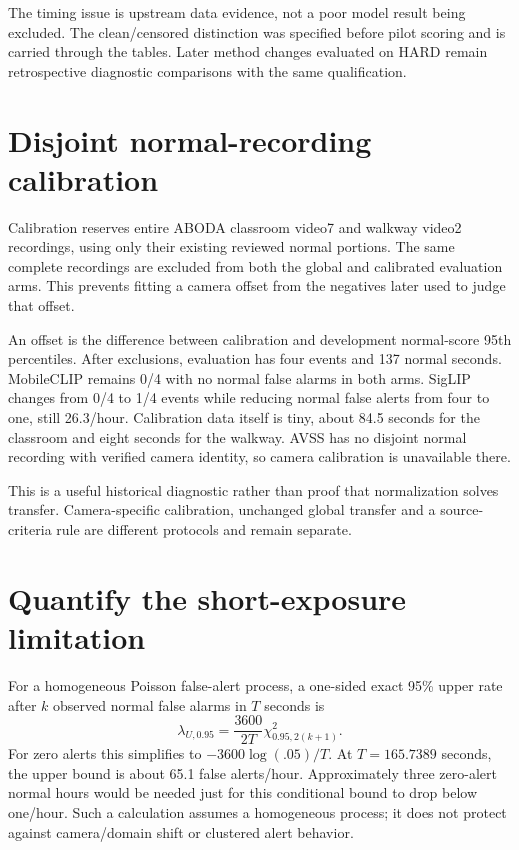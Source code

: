 The timing issue is upstream data evidence, not a poor model result being excluded. The clean/censored distinction was specified before pilot scoring and is carried through the tables. Later method changes evaluated on HARD remain retrospective diagnostic comparisons with the same qualification.

\section{Disjoint normal-recording calibration}
Calibration reserves entire ABODA classroom video7 and walkway video2 recordings, using only their existing reviewed normal portions. The same complete recordings are excluded from both the global and calibrated evaluation arms. This prevents fitting a camera offset from the negatives later used to judge that offset.

An offset is the difference between calibration and development normal-score 95th percentiles. After exclusions, evaluation has four events and 137 normal seconds. MobileCLIP remains 0/4 with no normal false alarms in both arms. SigLIP changes from 0/4 to 1/4 events while reducing normal false alerts from four to one, still 26.3/hour. Calibration data itself is tiny, about 84.5 seconds for the classroom and eight seconds for the walkway. AVSS has no disjoint normal recording with verified camera identity, so camera calibration is unavailable there.

This is a useful historical diagnostic rather than proof that normalization solves transfer. Camera-specific calibration, unchanged global transfer and a source-criteria rule are different protocols and remain separate.

\section{Quantify the short-exposure limitation}
For a homogeneous Poisson false-alert process, a one-sided exact 95\% upper rate after $k$ observed normal false alarms in $T$ seconds is
\begin{equation}
\lambda_{U,0.95}=\frac{3600}{2T}\chi^2_{0.95,2(k+1)}.
\end{equation}
For zero alerts this simplifies to $-3600\log(.05)/T$. At $T=165.7389$ seconds, the upper bound is about 65.1 false alerts/hour. Approximately three zero-alert normal hours would be needed just for this conditional bound to drop below one/hour. Such a calculation assumes a homogeneous process; it does not protect against camera/domain shift or clustered alert behavior.


